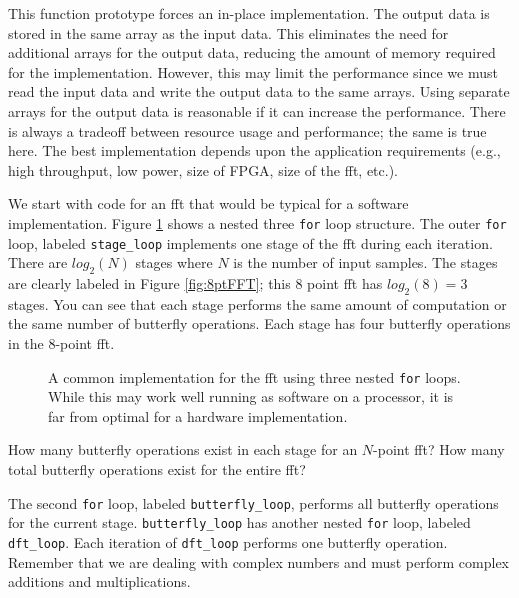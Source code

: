 This function prototype forces an in-place implementation. The output data is stored in the same array as the input data. This eliminates the need for additional arrays for the output data, reducing the amount of memory required for the implementation. However, this may limit the performance since we must read the input data and write the output data to the same arrays. Using separate arrays for the output data is reasonable if it can increase the performance. There is always a tradeoff between resource usage and performance; the same is true here. The best implementation depends upon the application requirements (e.g., high throughput, low power, size of FPGA, size of the \gls{fft}, etc.).


We start with code for an \gls{fft} that would be typical for a software implementation. Figure \ref{fig:fft_sw} shows a nested three \lstinline|for| loop structure. The outer \lstinline|for| loop, labeled \lstinline|stage_loop| implements one stage of the \gls{fft} during each iteration. There are $log_2(N)$ stages where $N$ is the number of input samples. The stages are clearly labeled in Figure \ref{fig:8ptFFT}; this 8 point \gls{fft} has $log_2(8) = 3$ stages. You can see that each stage performs the same amount of computation or the same number of butterfly operations. Each stage has four butterfly operations in the 8-point \gls{fft}. 

\begin{figure}

\caption{ A common implementation for the \gls{fft} using three nested \lstinline|for| loops.  While this may work well running as software on a processor, it is far from optimal for a hardware implementation.}
\label{fig:fft_sw}
\end{figure}

\begin{exercise}
How many butterfly operations exist in each stage for an $N$-point \gls{fft}? How many total butterfly operations exist for the entire \gls{fft}?
\end{exercise}

The second \lstinline|for| loop, labeled \lstinline|butterfly_loop|, performs all butterfly operations for the current stage. \lstinline|butterfly_loop| has another nested \lstinline|for| loop, labeled \lstinline|dft_loop|. Each iteration of \lstinline|dft_loop| performs one butterfly operation. Remember that we are dealing with complex numbers and must perform complex additions and multiplications. 


